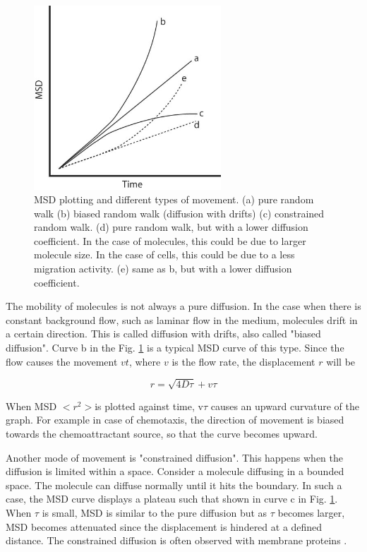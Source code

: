 \begin{figure}[htbp]
\begin{center}
\includegraphics[width=7cm]{img/CMCIBasicCourse201102-img151.jpg}
\caption{ MSD plotting and different types of movement. (a) pure random walk (b) biased random walk (diffusion with drifts) (c)
constrained random walk. (d) pure random walk, but with a lower
diffusion coefficient. In the case of molecules, this could be due to
larger molecule size. In the case of cells, this could be due to a less
migration activity. (e) same as b, but with a lower diffusion
coefficient. }
\label{fig:img151}
\end{center}
\end{figure}

The mobility of molecules is not always a pure diffusion. In the case
when there is constant background flow, such as laminar flow in the
medium, molecules drift in a certain direction. This is called
diffusion with drifts, also called "biased
diffusion". Curve b in the Fig. \ref{fig:img151} is a typical MSD
curve of this type. Since the flow causes the movement $vt$,
where $v$ is the flow rate, the displacement $r$ will be


\begin{equation}
r = \sqrt{4 D \tau} + v\tau
\end{equation}

When MSD $<r^{2}>$is plotted
against time, v$\tau$ causes an upward curvature of the
graph. For example in case of chemotaxis, the direction of movement is
biased towards the chemoattractant source, so that the curve becomes
upward.

Another mode of movement is "constrained
diffusion". This happens when the diffusion is limited
within a space. Consider a molecule diffusing in a bounded space. The
molecule can diffuse normally until it hits the boundary. In such a
case, the MSD curve displays a plateau such that shown in curve c in
Fig. \ref{fig:img151}. When $\tau$ is small, MSD is similar
to the pure diffusion but as $\tau$ becomes larger, MSD
becomes attenuated since the displacement is hindered at a defined
distance. The constrained diffusion is often observed with membrane
proteins \citep{saxtonBJ1997}.





